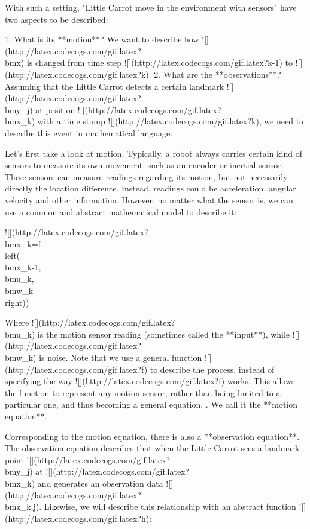 With such a setting, "Little Carrot move in the environment with sensors" have two aspects to be described:

1.  What is its **motion**? We want to describe how ![](http://latex.codecogs.com/gif.latex?\\bm{x}) is changed from time step ![](http://latex.codecogs.com/gif.latex?k-1) to ![](http://latex.codecogs.com/gif.latex?k).
2.  What are the **observations**? Assuming that the Little Carrot detects a certain landmark ![](http://latex.codecogs.com/gif.latex?\\bm{y}_j) at position ![](http://latex.codecogs.com/gif.latex?\\bm{x}_k) with a time stamp ![](http://latex.codecogs.com/gif.latex?k), we need to describe this event in mathematical language.

Let's first take a look at motion. Typically, a robot always carries certain kind of sensors to measure its own movement, such as an encoder or inertial sensor. These sensors can measure readings regarding its motion, but not necessarily directly the location difference. Instead, readings could be acceleration, angular velocity and other information. However, no matter what the sensor is, we can use a common and abstract mathematical model to describe it:

![](http://latex.codecogs.com/gif.latex?\\bm{x}_k=f\\left({{\\bm{x}_{k-1}},{\\bm{u}_k},\\bm{w}_k}\\right))

Where ![](http://latex.codecogs.com/gif.latex?\\bm{u}_k) is the motion sensor reading (sometimes called the **input**), while ![](http://latex.codecogs.com/gif.latex?\\bm{w}_k) is noise. Note that we use a general function ![](http://latex.codecogs.com/gif.latex?f) to describe the process, instead of specifying the way ![](http://latex.codecogs.com/gif.latex?f) works. This allows the function to represent any motion sensor, rather than being limited to a particular one, and thus becoming a general equation, . We call it the **motion equation**.

Corresponding to the motion equation, there is also a **observation equation**. The observation equation describes that when the Little Carrot sees a landmark point ![](http://latex.codecogs.com/gif.latex?\\bm{y}_j) at ![](http://latex.codecogs.com/gif.latex?\\bm{x}_k) and generates an observation data ![](http://latex.codecogs.com/gif.latex?\\bm{z}_{k,j}). Likewise, we will describe this relationship with an abstract function ![](http://latex.codecogs.com/gif.latex?h):

